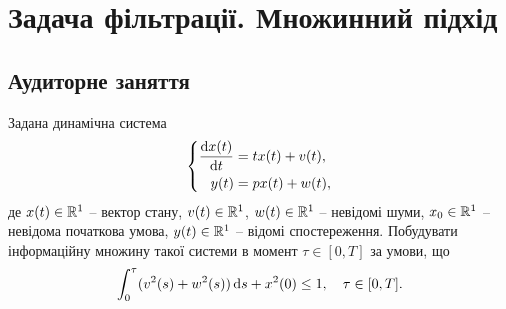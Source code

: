 \section{Задача фільтрації. Множинний підхід}

\subsection{Аудиторне заняття}

\begin{problem}
	Задана динамічна система \[ \left\{ \begin{aligned}
		\frac{\mathop{}\!\mathrm{d} x(t)}{\mathop{}\!\mathrm{d} t} &= t x(t) + v(t), \\
		y(t) &= p x(t) + w(t),
	\end{aligned} \right. \]
	де $x(t) \in \mathbb{R}^1$ -- вектор стану, $v(t) \in \mathbb{R}^1$, $w(t) \in \mathbb{R}^1$ -- невідомі шуми, $x_0 \in \mathbb{R}^1$ -- невідома початкова умова, $y(t) \in \mathbb{R}^1$ -- відомі спостереження. Побудувати інформаційну множину такої системи в момент $\tau \in [0, T]$ за умови, що \[ \int_0^\tau (v^2(s) + w^2(s)) \mathop{}\!\mathrm{d} s + x^2(0) \le 1, \quad \tau \in [0, T]. \]
\end{problem}

